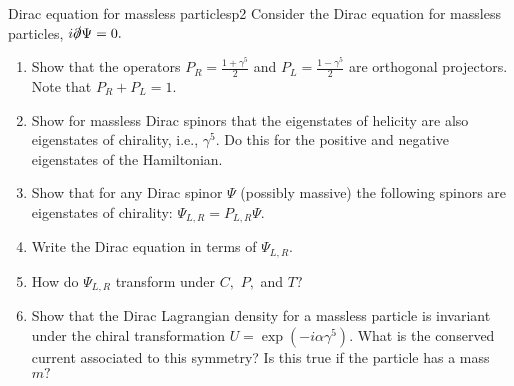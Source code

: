 \begin{problem}{Dirac equation for massless particles}{p2}
   Consider the Dirac equation for massless particles, \(i \slashed{\partial} \Psi = 0.\)
   \begin{enumerate}[label=(\alph*)]
      \item Show that the operators \(P_R = \frac{1 + \gamma^5}{2}\) and \(P_L = \frac{1 - \gamma^5}{2}\) are orthogonal projectors. Note that \(P_R + P_L = 1.\)
      \item Show  for massless Dirac spinors that the eigenstates of helicity are also eigenstates of chirality, i.e., \(\gamma^5\). Do this for the positive and negative eigenstates of the Hamiltonian.
      \item Show that for any Dirac spinor \(\Psi\) (possibly massive) the following spinors are eigenstates of chirality: \(\Psi_{L,R} = P_{L,R} \Psi.\)
      \item Write the Dirac equation in terms of \(\Psi_{L,R}.\)
      \item How do \(\Psi_{L,R}\) transform under \(C,\) \(P,\) and \(T?\)
      \item Show that the Dirac Lagrangian density for a massless particle is invariant under the chiral transformation \(U = \exp(-i \alpha \gamma^5)\). What is the conserved current associated to this symmetry? Is this true if the particle has a mass \(m?\)
   \end{enumerate}
\end{problem}
